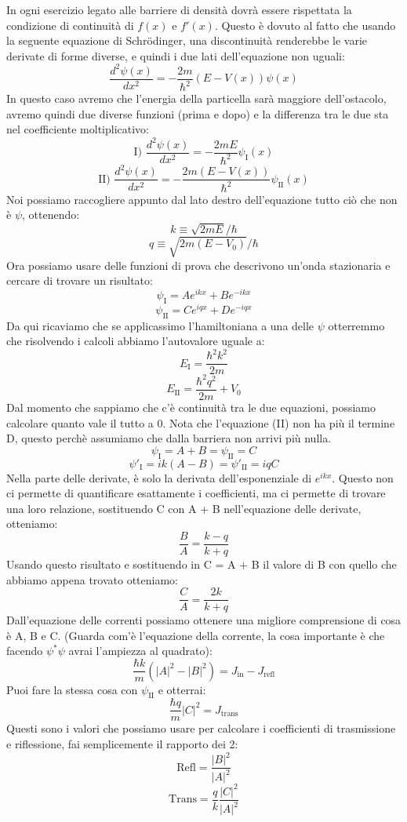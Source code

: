 In ogni esercizio legato alle barriere di densità dovrà essere rispettata la condizione di continuità di $f(x)$ e $f'(x)$. Questo è dovuto al fatto che usando la seguente equazione di Schr\"{o}dinger, una discontinuità renderebbe le varie derivate di forme diverse, e quindi i due lati dell'equazione non uguali:
$$\frac{d^2\psi(x)}{dx^2}=-\frac{2m}{\hbar^2}(E-V(x))\psi(x)$$
In questo caso avremo che l'energia della particella sarà maggiore dell'ostacolo, avremo quindi due diverse funzioni (prima e dopo) e la differenza tra le due sta nel coefficiente moltiplicativo:
$$\text{I) } \frac{d^2\psi(x)}{dx^2}=-\frac{2mE}{\hbar^2}\psi_{\text{I}}(x)$$
$$\text{II) } \frac{d^2\psi(x)}{dx^2}=-\frac{2m(E-V(x))}{\hbar^2}\psi_{\text{II}}(x)$$
Noi possiamo raccogliere appunto dal lato destro dell'equazione tutto ciò che non è $\psi$, ottenendo:
$$k \equiv \sqrt{2mE} / \hbar$$
$$q \equiv \sqrt{2m(E-V_0)} / \hbar$$
Ora possiamo usare delle funzioni di prova che descrivono un'onda stazionaria e cercare di trovare un risultato:
$$\psi_{\text{I}} = Ae^{ikx} + Be^{-ikx}$$
$$\psi_{\text{II}} = Ce^{iqx} + De^{-iqx}$$
Da qui ricaviamo che se applicassimo l'hamiltoniana a una delle $\psi$ otterremmo che risolvendo i calcoli abbiamo l'autovalore uguale a:
$$E_{\text{I}} = \frac{\hbar^2k^2}{2m}$$
$$E_{\text{II}} = \frac{\hbar^2q^2}{2m}+V_0$$
Dal momento che sappiamo che c'è continuità tra le due equazioni, possiamo calcolare quanto vale il tutto a 0. Nota che l'equazione (II) non ha più il termine D, questo perchè assumiamo che dalla barriera non arrivi più nulla.
$$\psi_{\text{I}}=A+B = \psi_{\text{II}}=C$$
$$\psi'_{\text{I}}=ik(A-B) = \psi'_{\text{II}}=iqC$$
Nella parte delle derivate, è solo la derivata dell'esponenziale di $e^{ikx}$. Questo non ci permette di quantificare esattamente i coefficienti, ma ci permette di trovare una loro relazione, sostituendo C con A + B nell'equazione delle derivate, otteniamo:
$$\frac{B}{A} = \frac{k-q}{k+q}$$
Usando questo risultato e sostituendo in C = A + B il valore di B con quello che abbiamo appena trovato otteniamo:
$$\frac{C}{A}=\frac{2k}{k+q}$$
Dall'equazione delle correnti possiamo ottenere una migliore comprensione di cosa è A, B e C. (Guarda com'è l'equazione della corrente, la cosa importante è che facendo $\psi^*\psi$ avrai l'ampiezza al quadrato):
$$\frac{\hbar k}{m}(|A|^2-|B|^2) = J_{\text{in}} - J_{\text{refl}}$$
Puoi fare la stessa cosa con $\psi_{\text{II}}$ e otterrai:
$$\frac{\hbar q}{m}|C|^2 = J_{\text{trans}}$$
Questi sono i valori che possiamo usare per calcolare i coefficienti di trasmissione e riflessione, fai semplicemente il rapporto dei 2:
$$\text{Refl} = \frac{|B|^2}{|A|^2}$$
$$\text{Trans} = \frac{q}{k}\frac{|C|^2}{|A|^2}$$

